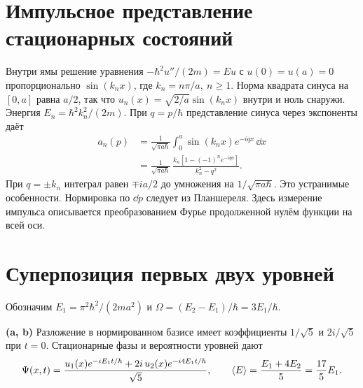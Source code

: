 \documentclass[11pt,a4paper]{article}
\begin{document}

\section{Импульсное представление стационарных состояний}

Внутри ямы решение уравнения \(-\hbar^2 u''/(2m)=Eu\)
с \(u(0)=u(a)=0\) пропорционально \(\sin(k_nx)\),
где \(k_n=n\pi/a,\ n\ge1\). Норма квадрата синуса на
\([0,a]\) равна \(a/2\), так что \(u_n(x)=\sqrt{2/a}\sin(k_nx)\)
внутри и ноль снаружи. Энергия \(E_n=\hbar^2k_n^2/(2m)\).
При \(q=p/\hbar\) представление синуса через экспоненты даёт
\begin{align*}
 a_n(p)&=\frac1{\sqrt{\pi a\hbar}}\int_0^a
                         \sin(k_nx)e^{-iqx}\,\dd x\\
       &=\frac1{\sqrt{\pi a\hbar}}\,
           \frac{k_n[1-(-1)^n e^{-iqa}]}{k_n^2-q^2}.
\end{align*}
При \(q=\pm k_n\) интеграл равен \(\mp ia/2\) до умножения
на \(1/\sqrt{\pi a\hbar}\). Это устранимые особенности.
Нормировка по \(\dd p\) следует из Планшереля.
Здесь измерение импульса описывается преобразованием Фурье
продолженной нулём функции на всей оси.

\section{Суперпозиция первых двух уровней}

Обозначим \(E_1=\pi^2\hbar^2/(2ma^2)\) и
\(\Omega=(E_2-E_1)/\hbar=3E_1/\hbar\).

\textbf{(a, b)} Разложение в нормированном базисе имеет
коэффициенты \(1/\sqrt5\) и \(2i/\sqrt5\) при \(t=0\).
Стационарные фазы и вероятности уровней дают
\[
 \Psi(x,t)=\frac{u_1(x)e^{-iE_1t/\hbar}
                    +2i\,u_2(x)e^{-i4E_1t/\hbar}}{\sqrt5},
 \qquad \langle E\rangle=\frac{E_1+4E_2}{5}=\frac{17}{5}E_1 .
\]
\end{document}
